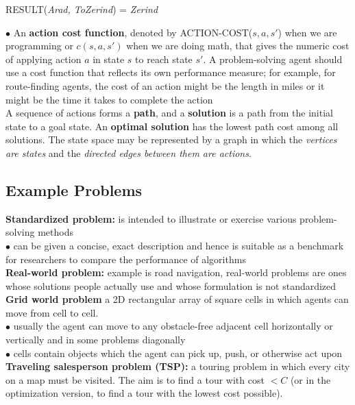         \begin{center}
            RESULT(\textit{Arad, ToZerind}) = \textit{Zerind}
        \end{center}

        \indent $\bullet$ An \textbf{action cost function}, denoted by ACTION-COST($s,a,s'$) when we are programming or $c(s,a,s')$ when we are doing math, that gives the numeric cost of applying action $a$ in state $s$
        to reach state $s'$. A problem-solving agent should use a cost function that reflects its own performance measure; for example, for route-finding agents, the cost of an action might be the length in miles or it
        might be the time it takes to complete the action \\

        A sequence of actions forms a \textbf{path}, and a \textbf{solution} is a path from the initial state to a goal state. An \textbf{optimal solution} has the lowest path cost among all solutions. The state space
        may be represented by a graph in which the \textit{vertices are states} and the \textit{directed edges between them are actions}.
        
    \subsection{Example Problems}                           %

        \textbf{Standardized problem:} is intended to illustrate or exercise various problem-solving methods \\
        $\bullet$ can be given a concise, exact description and hence is suitable as a benchmark for researchers to compare the performance of algorithms \\
        \textbf{Real-world problem:} example is road navigation, real-world problems are ones whose solutions people actually use and whose formulation is not standardized \\
        \textbf{Grid world problem} a 2D rectangular array of square cells in which agents can move from cell to cell. \\
        $\bullet$ usually the agent can move to any obstacle-free adjacent cell horizontally or vertically and in some problems diagonally \\
        $\bullet$ cells contain objects which the agent can pick up, push, or otherwise act upon \\

        \textbf{Traveling salesperson problem (TSP):} a touring problem in which every city on a map must be visited. The aim is to find a tour with cost $< C$ (or in the optimization version, to find a tour with the
        lowest cost possible).

